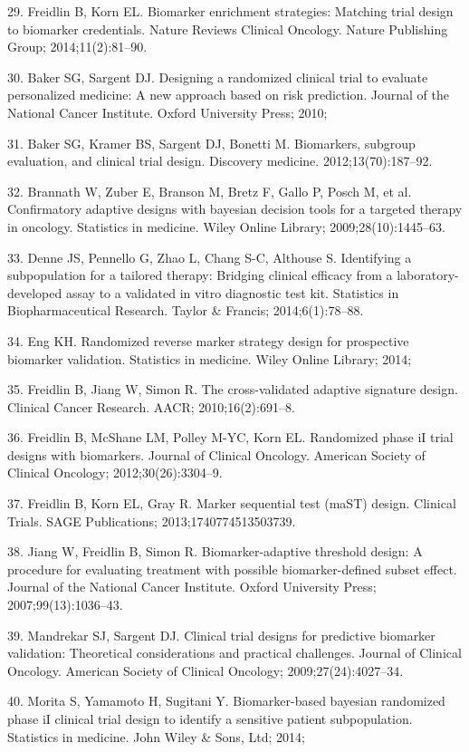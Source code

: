 \documentclass[11pt]{article}
\begin{document}
29. Freidlin B, Korn EL. Biomarker enrichment strategies: Matching trial
design to biomarker credentials. Nature Reviews Clinical Oncology.
Nature Publishing Group; 2014;11(2):81--90.

30. Baker SG, Sargent DJ. Designing a randomized clinical trial to
evaluate personalized medicine: A new approach based on risk prediction.
Journal of the National Cancer Institute. Oxford University Press; 2010;

31. Baker SG, Kramer BS, Sargent DJ, Bonetti M. Biomarkers, subgroup
evaluation, and clinical trial design. Discovery medicine.
2012;13(70):187--92.

32. Brannath W, Zuber E, Branson M, Bretz F, Gallo P, Posch M, et al.
Confirmatory adaptive designs with bayesian decision tools for a
targeted therapy in oncology. Statistics in medicine. Wiley Online
Library; 2009;28(10):1445--63.

33. Denne JS, Pennello G, Zhao L, Chang S-C, Althouse S. Identifying a
subpopulation for a tailored therapy: Bridging clinical efficacy from a
laboratory-developed assay to a validated in vitro diagnostic test kit.
Statistics in Biopharmaceutical Research. Taylor \& Francis;
2014;6(1):78--88.

34. Eng KH. Randomized reverse marker strategy design for prospective
biomarker validation. Statistics in medicine. Wiley Online Library;
2014;

35. Freidlin B, Jiang W, Simon R. The cross-validated adaptive signature
design. Clinical Cancer Research. AACR; 2010;16(2):691--8.

36. Freidlin B, McShane LM, Polley M-YC, Korn EL. Randomized phase iI
trial designs with biomarkers. Journal of Clinical Oncology. American
Society of Clinical Oncology; 2012;30(26):3304--9.

37. Freidlin B, Korn EL, Gray R. Marker sequential test (maST) design.
Clinical Trials. SAGE Publications; 2013;1740774513503739.

38. Jiang W, Freidlin B, Simon R. Biomarker-adaptive threshold design: A
procedure for evaluating treatment with possible biomarker-defined
subset effect. Journal of the National Cancer Institute. Oxford
University Press; 2007;99(13):1036--43.

39. Mandrekar SJ, Sargent DJ. Clinical trial designs for predictive
biomarker validation: Theoretical considerations and practical
challenges. Journal of Clinical Oncology. American Society of Clinical
Oncology; 2009;27(24):4027--34.

40. Morita S, Yamamoto H, Sugitani Y. Biomarker-based bayesian
randomized phase iI clinical trial design to identify a sensitive
patient subpopulation. Statistics in medicine. John Wiley \& Sons, Ltd;
2014;
\end{document}
